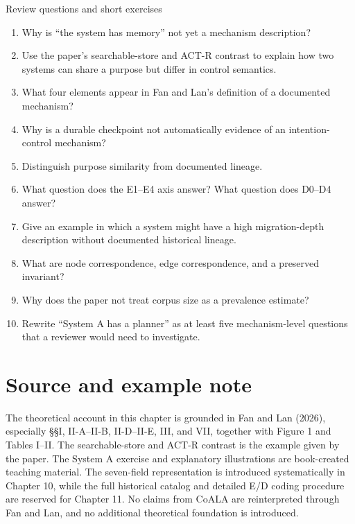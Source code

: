 \begin{reviewquestions}{Review questions and short exercises}
\begin{enumerate}
  \item Why is ``the system has memory'' not yet a mechanism description?
  \item Use the paper's searchable-store and ACT-R contrast to explain how two systems can share a purpose but differ in control semantics.
  \item What four elements appear in Fan and Lan's definition of a documented mechanism?
  \item Why is a durable checkpoint not automatically evidence of an intention-control mechanism?
  \item Distinguish purpose similarity from documented lineage.
  \item What question does the E1--E4 axis answer? What question does D0--D4 answer?
  \item Give an example in which a system might have a high migration-depth description without documented historical lineage.
  \item What are node correspondence, edge correspondence, and a preserved invariant?
  \item Why does the paper not treat corpus size as a prevalence estimate?
  \item Rewrite ``System A has a planner'' as at least five mechanism-level questions that a reviewer would need to investigate.
\end{enumerate}
\end{reviewquestions}

\section*{Source and example note}
The theoretical account in this chapter is grounded in Fan and Lan (2026), especially §§I, II-A--II-B, II-D--II-E, III, and VII, together with Figure 1 and Tables I--II. The searchable-store and ACT-R contrast is the example given by the paper. The System A exercise and explanatory illustrations are book-created teaching material. The seven-field representation is introduced systematically in Chapter 10, while the full historical catalog and detailed E/D coding procedure are reserved for Chapter 11. No claims from CoALA are reinterpreted through Fan and Lan, and no additional theoretical foundation is introduced.

